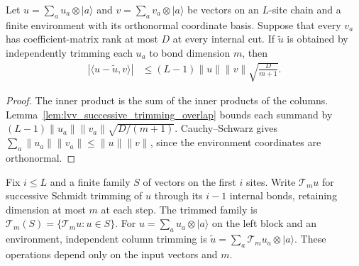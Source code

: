 \begin{lemma}
    \label{lem:lvv_columnwise_trimming_overlap}
    \leanok
    Let $u=\sum_a u_a\otimes|a\rangle$ and
    $v=\sum_a v_a\otimes|a\rangle$ be vectors on an $L$-site chain and a
    finite environment with its orthonormal coordinate basis. Suppose that
    every $v_a$ has coefficient-matrix rank at most $D$ at every internal
    cut. If $\widetilde u$ is obtained by independently trimming each
    $u_a$ to bond dimension $m$, then
    \begin{align}
        |\langle u-\widetilde u,v\rangle|
         & \le (L-1)\|u\|\|v\|\sqrt{\frac{D}{m+1}}.
    \end{align}
\end{lemma}
\begin{proof}
    \leanok
    The inner product is the sum of the inner products of the columns.
    Lemma~\ref{lem:lvv_successive_trimming_overlap} bounds each summand by
    $(L-1)\|u_a\|\|v_a\|\sqrt{D/(m+1)}$. Cauchy--Schwarz gives
    $\sum_a\|u_a\|\|v_a\|\le\|u\|\|v\|$, since the environment coordinates
    are orthonormal.
\end{proof}

\begin{definition}
    \label{def:lvv_bond_trimmed_family}
    \leanok
    Fix $i\le L$ and a finite family $S$ of vectors on the first $i$ sites.
    Write $\mathcal T_m u$ for successive Schmidt trimming of $u$ through
    its $i-1$ internal bonds, retaining dimension at most $m$ at each step.
    The trimmed family is $\mathcal T_m(S)=\{\mathcal T_m u:u\in S\}$.
    For $u=\sum_a u_a\otimes|a\rangle$ on the left block and an environment,
    independent column trimming is
    $\widetilde u=\sum_a\mathcal T_m u_a\otimes|a\rangle$.
    These operations depend only on the input vectors and $m$.
\end{definition}

